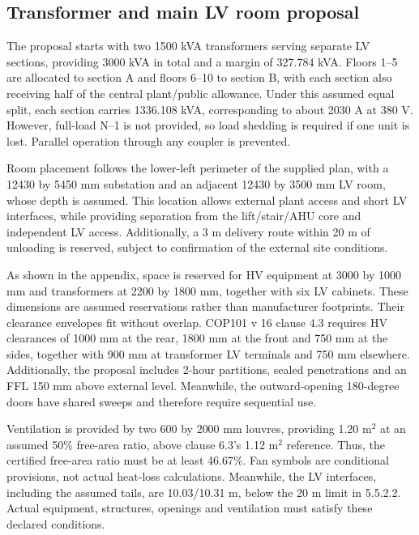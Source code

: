 \subsection*{Transformer and main LV room proposal}
The proposal starts with two 1500 kVA transformers serving separate LV sections, providing 3000 kVA in total and a margin of 327.784 kVA. Floors 1--5 are allocated to section A and floors 6--10 to section B, with each section also receiving half of the central plant/public allowance. Under this assumed equal split, each section carries 1336.108 kVA, corresponding to about 2030 A at 380 V. However, full-load N--1 is not provided, so load shedding is required if one unit is lost. Parallel operation through any coupler is prevented.

Room placement follows the lower-left perimeter of the supplied plan, with a 12430 by 5450 mm substation and an adjacent 12430 by 3500 mm LV room, whose depth is assumed. This location allows external plant access and short LV interfaces, while providing separation from the lift/stair/AHU core and independent LV access. Additionally, a 3 m delivery route within 20 m of unloading is reserved, subject to confirmation of the external site conditions.

As shown in the appendix, space is reserved for HV equipment at 3000 by 1000 mm and transformers at 2200 by 1800 mm, together with six LV cabinets. These dimensions are assumed reservations rather than manufacturer footprints. Their clearance envelopes fit without overlap. COP101 v 16 clause 4.3 requires HV clearances of 1000 mm at the rear, 1800 mm at the front and 750 mm at the sides, together with 900 mm at transformer LV terminals and 750 mm elsewhere. Additionally, the proposal includes 2-hour partitions, sealed penetrations and an FFL 150 mm above external level. Meanwhile, the outward-opening 180-degree doors have shared sweeps and therefore require sequential use.

Ventilation is provided by two 600 by 2000 mm louvres, providing 1.20 m$^2$ at an assumed 50\% free-area ratio, above clause 6.3's 1.12 m$^2$ reference. Thus, the certified free-area ratio must be at least 46.67\%. Fan symbols are conditional provisions, not actual heat-loss calculations. Meanwhile, the LV interfaces, including the assumed tails, are 10.03/10.31 m, below the 20 m limit in 5.5.2.2. Actual equipment, structures, openings and ventilation must satisfy these declared conditions.
